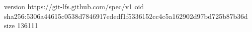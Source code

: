 version https://git-lfs.github.com/spec/v1
oid sha256:5306a44615c0538d7846917ededf1f5336152cc4c5a162902d97bd725b87b36d
size 136111
